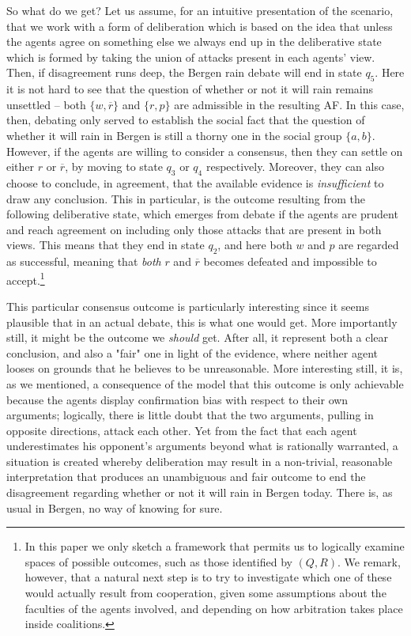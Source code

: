 \documentclass[greybox]{svmult}
\renewcommand{\bar}[1]{\overline{#1}}
\begin{document}
\begin{example}
So what do we get? Let us assume, for an intuitive presentation of the scenario, that we work with a form of deliberation which is based on the idea that unless the agents agree on something else we always end up in the deliberative state which is formed by taking the union of attacks present in each agents' view. Then, if disagreement runs deep, the Bergen rain debate will end in state $q_5$. Here it is not hard to see that the question of whether or not it will rain remains unsettled -- both $\{w,\bar r\}$ and $\{r,p\}$ are admissible in the resulting AF. In this case, then, debating only served to establish the social fact that the question of whether it will rain in Bergen is still a thorny one in the social group $\{a, b\}$. However, if the agents are willing to consider a consensus, then they can settle on either $r$ or $\bar r$, by moving to state $q_3$ or $q_4$ respectively. Moreover, they can also choose to conclude, in agreement, that the available evidence is \emph{insufficient} to draw any conclusion. This in particular, is the outcome resulting from the following deliberative state, which emerges from debate if the agents are prudent and reach agreement on including only those attacks that are present in both views. This means that they end in state $q_2$, and here both $w$ and $p$ are regarded as successful, meaning that \emph{both} $r$ and $\bar r$ becomes defeated and impossible to accept.\footnote{In this paper we only sketch a framework that permits us to logically examine spaces of possible outcomes, such as those identified by $(Q,R)$. We remark, however, that a natural next step is to try to investigate which one of these would actually result from cooperation, given some assumptions about the faculties of the agents involved, and depending on how arbitration takes place inside coalitions.} 

This particular consensus outcome is particularly interesting since it seems plausible that in an actual debate, this is what one would get. More importantly still, it might be the outcome we \emph{should} get. After all, it represent both a clear conclusion, and also a "fair" one in light of the evidence, where neither agent looses on grounds that he believes to be unreasonable. More interesting still, it is, as we mentioned, a consequence of the model that this outcome is only achievable because the agents display confirmation bias with respect to their own arguments; logically, there is little doubt that the two arguments, pulling in opposite directions, attack each other. Yet from the fact that each agent underestimates his opponent's arguments beyond what is rationally warranted, a situation is created whereby deliberation may result in a non-trivial, reasonable interpretation that produces an unambiguous and fair outcome to end the disagreement regarding whether or not it will rain in Bergen today. There is, as usual in Bergen, no way of knowing for sure.

\end{example}
\end{document}
